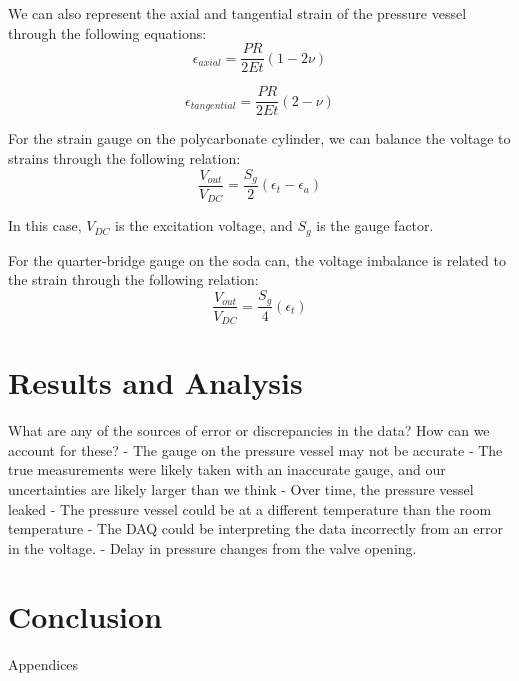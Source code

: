 \documentclass{article}
\begin{document}
We can also represent the axial and tangential strain of the pressure vessel through the following equations:
\[
\epsilon_{axial} = \frac{PR}{2E t}(1 - 2\nu)
\]

\[
\epsilon_{tangential} = \frac{PR}{2E t}(2 - \nu)
\]

For the strain gauge on the polycarbonate cylinder, we can balance the voltage to strains through the following relation:
\[
  \frac{V_{out}}{V_{DC}} = \frac{S_g}{2}(\epsilon_t - \epsilon_a)
\]

In this case, $V_{DC}$ is the excitation voltage, and $S_g$ is the gauge factor.

For the quarter-bridge gauge on the soda can, the voltage imbalance is related to the strain through the following relation:
\[
  \frac{V_{out}}{V_{DC}} = \frac{S_g}{4}(\epsilon_t)
\]



\section{Results and Analysis}



What are any of the sources of error or discrepancies in the data? How can we account for these?
- The gauge on the pressure vessel may not be accurate
- The true measurements were likely taken with an inaccurate gauge, and our uncertainties are likely larger than we think
- Over time, the pressure vessel leaked
- The pressure vessel could be at a different temperature than the room temperature
- The DAQ could be interpreting the data incorrectly from an error in the voltage.
- Delay in pressure changes from the valve opening.

\section{Conclusion}

\newpage
\thispagestyle{empty}  %
\begin{center}
	\vspace*{\fill}
	{\Huge Appendices}
	\vspace*{\fill}
\end{center}
\end{document}
